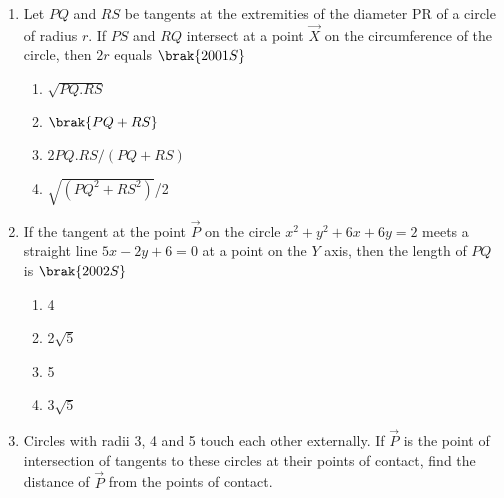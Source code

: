 \begin{enumerate}
%
\hfill{}
\begin{multicols}{2}
\begin{multicols}{2}
\begin{enumerate}
\item The point  lies on $E_1$
\item The point  does \textbf{NOT} lie on $E_1$
\item The point  lies on $E_1$
\item The point  does not lie on $E_1$
\end{enumerate}
\end{multicols}
\end{multicols}
        \item Let $PQ$ and $RS$ be tangents at the extremities of the diameter PR of a circle of radius $r$. If $PS$ and $RQ$ intersect at a point $\vec{X}$ on the circumference of the circle,  then $2r$ equals
        \hfill$\brak{2001S}$
        \begin{multicols}{2}
\begin{multicols}{2}
\begin{enumerate}
    \item $\sqrt{PQ.RS}$
     \item $\brak{PQ+RS}$
    \item $2PQ.RS/(PQ+RS)$
     \item {$\sqrt{(PQ^2+RS^2)}$}/2
     \end{enumerate}
\end{multicols}
\end{multicols}
     \item If the tangent at the point $\vec{P}$ on the circle $x^2+y^2+6x+6y=2$ meets a straight line $5x-2y+6=0$ at a point on the $Y$ axis,  then the length of $PQ$ is 
             \hfill$\brak{2002S}$
             \begin{multicols}{2}
\begin{multicols}{2}
\begin{enumerate}
             \item 4
             \item 2$\sqrt5$
             \item 5
             \item 3$\sqrt5$
\end{enumerate}
\end{multicols}
\end{multicols}
\item Circles with radii 3, 4 and 5 touch each other externally. If $\vec{P}$ is the point of intersection of tangents to these circles at their points of contact,  find the distance of $\vec{P}$ from the points of contact.

\end{enumerate}
